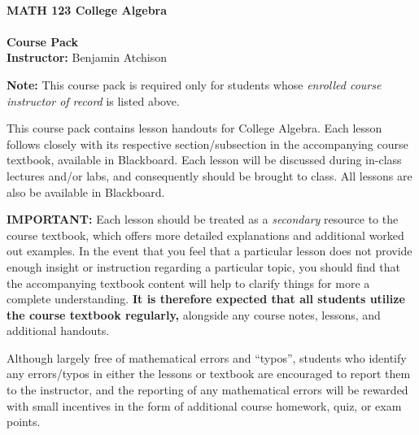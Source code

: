 \documentclass[12pt]{article}
\theoremstyle{definition}
\begin{document}
\thispagestyle{empty}
\ \vspace{2in}
\begin{center}
{\bf \Huge MATH 123 College Algebra\\
\ \\
Course Pack}\\
\vspace{0.5in}
\large {\bf Instructor:}
 Benjamin Atchison
\end{center}
\vspace{4.25in}
{\bf Note:} This course pack is required only for students whose {\it enrolled course instructor of record} is listed above.
\newpage
\thispagestyle{empty}
\hfill \doclicenseImage[imagewidth=5em]\\
\par
\normalsize This course pack contains lesson handouts for 
College Algebra.  Each lesson follows closely with its respective section/subsection in the accompanying course textbook, available in Blackboard.  Each lesson will be discussed during in-class lectures and/or labs, and consequently should be brought to class.  All lessons are also be available in Blackboard.\\
\par
{\bf IMPORTANT:} Each lesson should be treated as a {\it secondary} resource to the course textbook, which offers more detailed explanations and additional worked out examples.  In the event that you feel that a particular lesson does not provide enough insight or instruction regarding a particular topic, you should find that the accompanying textbook content will help to clarify things for more a complete understanding.  {\bf It is therefore expected that all students utilize the course textbook regularly,} alongside any course notes, lessons, and additional handouts.\\
\par
Although largely free of mathematical errors and ``typos'', students who identify any errors/typos in either the lessons or textbook are encouraged to report them to the instructor, and the reporting of any mathematical errors will be rewarded with small incentives in the form of additional course homework, quiz, or exam points.
\end{document}
